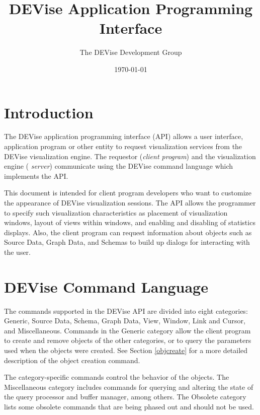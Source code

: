 \title{DEVise Application Programming Interface}
\author{The DEVise Development Group \\
}
\date{\today}

\maketitle

\section{Introduction}

The DEVise application programming interface (API) allows a user
interface, application program or other entity to request
visualization services from the DEVise visualization engine. The
requestor ({\em client program}) and the visualization engine ({\em
server}) communicate using the DEVise command language which
implements the API.

This document is intended for client program developers who want to
customize the appearance of DEVise visualization sessions. The API
allows the programmer to specify such visualization characteristics as
placement of visualization windows, layout of views within windows,
and enabling and disabling of statistics displays. Also, the client
program can request information about objects such as Source Data,
Graph Data, and Schemas to build up dialogs for interacting with the
user.

\section{DEVise Command Language}

The commands supported in the DEVise API are divided into eight
categories: Generic, Source Data, Schema, Graph Data, View, Window,
Link and Cursor, and Miscellaneous. Commands in the Generic category
allow the client program to create and remove objects of the other
categories, or to query the parameters used when the objects were
created. See Section \ref{objcreate} for a more detailed description
of the object creation command.

The category-specific commands control the behavior of the
objects. The Miscellaneous category includes commands for querying and
altering the state of the query processor and buffer manager, among
others. The Obsolete category lists some obsolete commands that are
being phased out and should not be used.

